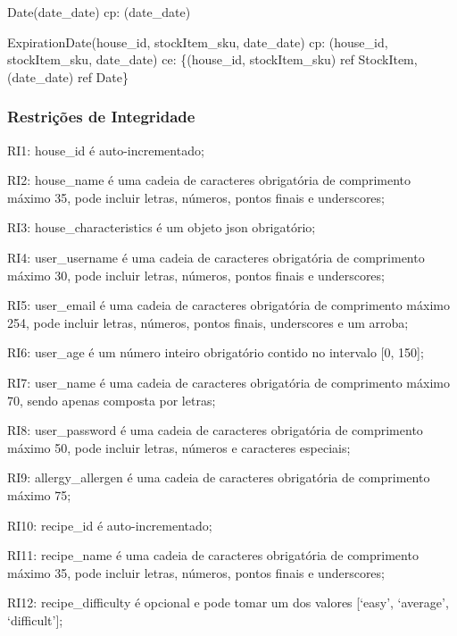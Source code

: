 {\begin{description}
		\item Date(date\_date) \newline
		\acrshort{cp}: (date\_date)
		
		\item ExpirationDate(house\_id, stockItem\_sku, date\_date) \newline
		\acrshort{cp}: (house\_id, stockItem\_sku, date\_date) \newline
		\acrshort{ce}: \{(house\_id, stockItem\_sku) ref StockItem, (date\_date) ref Date\}
	\end{description}	
}


\subsubsection{Restrições de Integridade}
\begin{description}
	\item RI1: house\_id é auto-incrementado;
	\item RI2: house\_name é uma cadeia de caracteres obrigatória de comprimento máximo 35, pode incluir letras, números, pontos finais e underscores;
	\item RI3: house\_characteristics é um objeto \acrshort{json} obrigatório;
	\item RI4: user\_username é uma cadeia de caracteres obrigatória de comprimento máximo 30, pode incluir letras, números, pontos finais e underscores;
	\item RI5: user\_email é uma cadeia de caracteres obrigatória de comprimento máximo 254, pode incluir letras, números, pontos finais, underscores e um arroba;
	\item RI6: user\_age é um número inteiro obrigatório contido no intervalo [0, 150];
	\item RI7: user\_name é uma cadeia de caracteres obrigatória de comprimento máximo 70, sendo apenas composta por letras;
	\item RI8: user\_password é uma cadeia de caracteres obrigatória de comprimento máximo 50, pode incluir letras, números e caracteres especiais;
	\item RI9: allergy\_allergen é uma cadeia de caracteres obrigatória de comprimento máximo 75;
	\item RI10: recipe\_id é auto-incrementado;
	\item RI11: recipe\_name é uma cadeia de caracteres obrigatória de comprimento máximo 35, pode incluir letras, números, pontos finais e underscores;
	\item RI12: recipe\_difficulty é opcional e pode tomar um dos valores [‘easy’, ‘average’, ‘difficult’];

\end{description}
